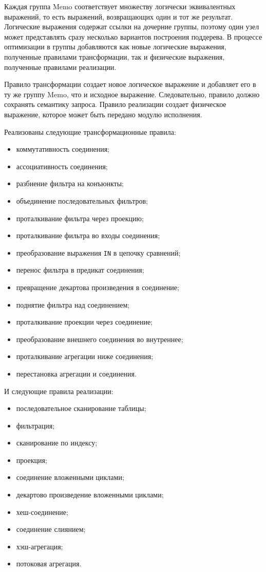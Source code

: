 \documentclass[14pt, russian]{scrartcl}
\begin{document}
Каждая группа Memo соответствует множеству логически эквивалентных выражений,
то есть выражений, возвращающих один и тот же результат. Логические выражения
содержат ссылки на дочерние группы, поэтому один узел может представлять сразу
несколько вариантов построения поддерева. В процессе оптимизации в группы
добавляются как новые логические выражения, полученные правилами
трансформации, так и физические выражения, полученные правилами реализации.

Правило трансформации создает новое логическое выражение и добавляет его в
ту же группу Memo, что и исходное выражение. Следовательно, правило должно
сохранять семантику запроса. Правило реализации создает физическое выражение,
которое может быть передано модулю исполнения.

Реализованы следующие трансформационные правила:
\begin{itemize}
  \item коммутативность соединения;
  \item ассоциативность соединения;
  \item разбиение фильтра на конъюнкты;
  \item объединение последовательных фильтров;
  \item проталкивание фильтра через проекцию;
  \item проталкивание фильтра во входы соединения;
  \item преобразование выражения \verb|IN| в цепочку сравнений;
  \item перенос фильтра в предикат соединения;
  \item превращение декартова произведения в соединение;
  \item поднятие фильтра над соединением;
  \item проталкивание проекции через соединение;
  \item преобразование внешнего соединения во внутреннее;
  \item проталкивание агрегации ниже соединения;
  \item перестановка агрегации и соединения.
\end{itemize}

И следующие правила реализации:
\begin{itemize}
  \item последовательное сканирование таблицы;
  \item фильтрация;
  \item сканирование по индексу;
  \item проекция;
  \item соединение вложенными циклами;
  \item декартово произведение вложенными циклами;
  \item хеш-соединение;
  \item соединение слиянием;
  \item хэш-агрегация;
  \item потоковая агрегация.
\end{itemize}
\end{document}
